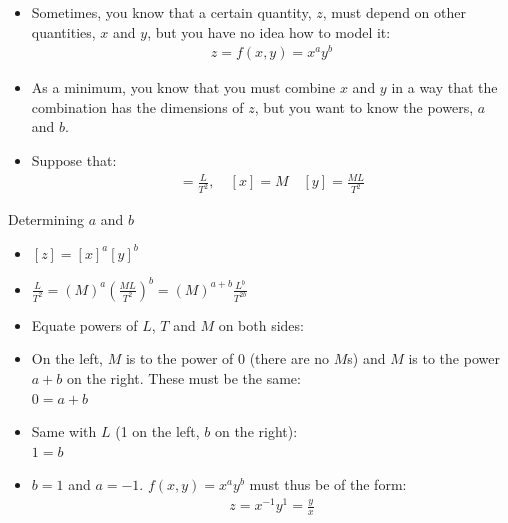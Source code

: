\documentclass[aspectratio=169,
hyperref={colorlinks,urlcolor=blue}
]{beamer}
\begin{document}







{
\begin{itemize}
\item Sometimes, you know that a certain quantity, $z$, must depend on other quantities, $x$ and $y$, but you have no idea how to model it:
\begin{eqnarray*}
z=f(x,y)=x^ay^b
\end{eqnarray*}
\item As a minimum, you know that you must combine $x$ and $y$ in a way that the combination has the dimensions of $z$, but you want to know the powers, $a$ and $b$. 
\item Suppose that:
\begin{eqnarray*}
[z]=\frac{L}{T^2},\quad [x]=M\quad [y]=\frac{ML}{T^2}
\end{eqnarray*}
\end{itemize}
}
{
\begin{exampleblock}{Determining $a$ and $b$}
\begin{itemize}
\item<1-> $[z] = [x]^a[y]^b$
\item<2-> $\frac{L}{T^2}=(M)^a\left(\frac{ML}{T^2} \right)^b=(M)^{a+b}\frac{L^{b}}{T^{2b}}$
\item<3->[$\rightarrow$] Equate powers of $L$, $T$ and $M$ on both sides:
\item<4-> On the left, $M$ is to the power of 0 (there are no $M$s) and $M$ is to the power $a+b$ on the right. These must be the same:\\
$0=a+b$
\item<5-> Same with $L$ (1 on the left, $b$ on the right):\\
$1=b$
\item<6->[$\rightarrow$] $b=1$ and $a=-1$. $f(x,y)=x^ay^b$ must thus be of the form:
\begin{eqnarray*}
z = x^{-1}y^{1}=\frac{y}{x}
\end{eqnarray*}
\end{itemize}

\end{exampleblock}
}







\end{document}
